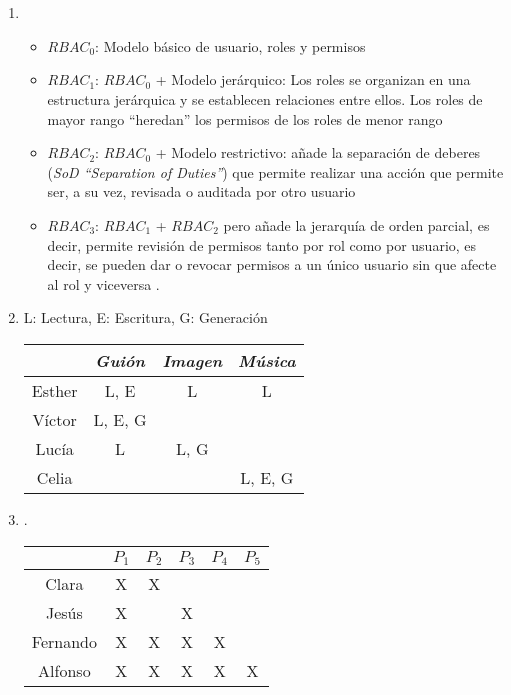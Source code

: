 \documentclass[10pt,a4paper]{article}
\begin{document}
\section{}
\begin{enumerate}[label=\alph*]

\item 
\begin{itemize}
\item $RBAC_{0}$: Modelo básico de usuario, roles y permisos
\item $RBAC_{1}$: $RBAC_{0}$ + Modelo jerárquico: Los roles se organizan en una estructura jerárquica y se establecen relaciones entre ellos. Los roles de mayor rango ``heredan'' los permisos de los roles de menor rango
\item $RBAC_{2}$: $RBAC_{0}$ + Modelo restrictivo: añade la separación de deberes (\textit{SoD ``Separation of Duties''}) que permite realizar una acción que permite ser, a su vez, revisada o auditada por otro usuario
\item $RBAC_{3}$:  $RBAC_{1}$ + $RBAC_{2}$ pero añade la jerarquía de orden parcial, es decir, permite revisión de permisos tanto por rol como por usuario, es decir, se pueden dar o revocar permisos a un único usuario sin que afecte al rol y viceversa \cite{rbac} \cite{nist}.
\end{itemize}

\item L: Lectura, E: Escritura, G: Generación

\begin{center}
  \begin{tabular}{ | c | c | c | c | }
    \hline
     & \textit{Guión} & \textit{Imagen} & \textit{Música} \\ \hline
    Esther & L, E & L & L \\ \hline
    Víctor & L, E, G &  &  \\ \hline
    Lucía & L & L, G &  \\ \hline
    Celia &  &  & L, E, G \\ 
    \hline
  \end{tabular}
\end{center}

\item .

\begin{center}
  \begin{tabular}{ | c | c | c | c | c | c | }
    \hline
      & $ P_{1} $ & $P_{2}$ & $P_{3}$ & $P_{4}$ & $P_{5}$ \\ \hline
    Clara  & X & X &  &  &  \\ \hline
    Jesús & X &  & X &  &  \\ \hline
    Fernando & X & X & X & X &  \\ \hline
    Alfonso & X & X & X & X & X \\ 
    \hline
  \end{tabular}
\end{center}


\end{enumerate}
\end{document}
